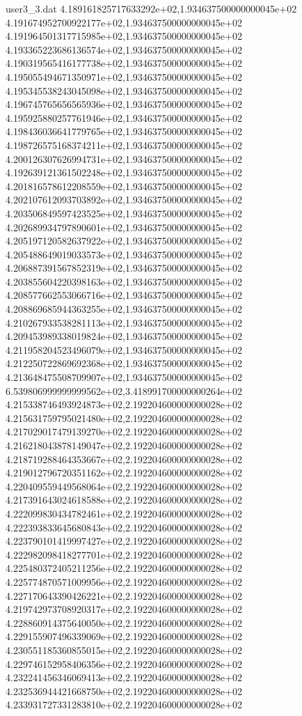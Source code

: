 \begin{filecontents}{user3_3.dat}
4.189161825717633292e+02,1.934637500000000045e+02
4.191674952700922177e+02,1.934637500000000045e+02
4.191964501317715985e+02,1.934637500000000045e+02
4.193365223686136574e+02,1.934637500000000045e+02
4.190319565416177738e+02,1.934637500000000045e+02
4.195055494671350971e+02,1.934637500000000045e+02
4.195345538243045098e+02,1.934637500000000045e+02
4.196745765656565936e+02,1.934637500000000045e+02
4.195925880257761946e+02,1.934637500000000045e+02
4.198436036641779765e+02,1.934637500000000045e+02
4.198726575168374211e+02,1.934637500000000045e+02
4.200126307626994731e+02,1.934637500000000045e+02
4.192639121361502248e+02,1.934637500000000045e+02
4.201816578612208559e+02,1.934637500000000045e+02
4.202107612093703892e+02,1.934637500000000045e+02
4.203506849597423525e+02,1.934637500000000045e+02
4.202689934797890601e+02,1.934637500000000045e+02
4.205197120582637922e+02,1.934637500000000045e+02
4.205488649019033573e+02,1.934637500000000045e+02
4.206887391567852319e+02,1.934637500000000045e+02
4.203855604220398163e+02,1.934637500000000045e+02
4.208577662553066716e+02,1.934637500000000045e+02
4.208869685944363255e+02,1.934637500000000045e+02
4.210267933538281113e+02,1.934637500000000045e+02
4.209453989338019824e+02,1.934637500000000045e+02
4.211958204523496079e+02,1.934637500000000045e+02
4.212250722869692368e+02,1.934637500000000045e+02
4.213648475508709907e+02,1.934637500000000045e+02
6.539806999999999562e+02,3.418991700000000264e+02
4.215338746493924873e+02,2.192204600000000028e+02
4.215631759795021480e+02,2.192204600000000028e+02
4.217029017479139270e+02,2.192204600000000028e+02
4.216218043878149047e+02,2.192204600000000028e+02
4.218719288464353667e+02,2.192204600000000028e+02
4.219012796720351162e+02,2.192204600000000028e+02
4.220409559449568064e+02,2.192204600000000028e+02
4.217391643024618588e+02,2.192204600000000028e+02
4.222099830434782461e+02,2.192204600000000028e+02
4.222393833645680843e+02,2.192204600000000028e+02
4.223790101419997427e+02,2.192204600000000028e+02
4.222982098418277701e+02,2.192204600000000028e+02
4.225480372405211256e+02,2.192204600000000028e+02
4.225774870571009956e+02,2.192204600000000028e+02
4.227170643390426221e+02,2.192204600000000028e+02
4.219742973708920317e+02,2.192204600000000028e+02
4.228860914375640050e+02,2.192204600000000028e+02
4.229155907496339069e+02,2.192204600000000028e+02
4.230551185360855015e+02,2.192204600000000028e+02
4.229746152958406356e+02,2.192204600000000028e+02
4.232241456346069413e+02,2.192204600000000028e+02
4.232536944421668750e+02,2.192204600000000028e+02
4.233931727331283810e+02,2.192204600000000028e+02

\end{filecontents}
